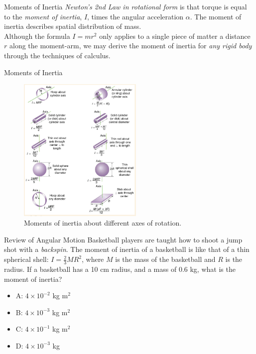 \documentclass{beamer}
\begin{document}
\begin{frame}{Moments of Inertia}
\textit{Newton's 2nd Law in rotational form} is that torque is equal to the \textit{moment of inertia}, $I$, times the angular acceleration $\alpha$.  \alert{The moment of inertia describes spatial distribution of mass}.  \\ \vspace{0.5cm} Although the formula $I = mr^2$ only applies to a single piece of matter a distance $r$ along the moment-arm, we may derive the moment of inertia for \textit{any rigid body} through the techniques of calculus.
\end{frame}

\begin{frame}{Moments of Inertia}
\begin{figure}
\centering
\includegraphics[width=0.53\textwidth]{figures/moment.png}
\caption{\label{fig:moment} Moments of inertia about different axes of rotation.}
\end{figure}
\end{frame}

\begin{frame}{Review of Angular Motion}
Basketball players are taught how to shoot a jump shot with a \textit{backspin}.  The moment of inertia of a basketball is like that of a thin spherical shell: $I = \frac{2}{3}MR^2$, where $M$ is the mass of the basketball and $R$ is the radius.  If a basketball has a 10 cm radius, and a mass of 0.6 kg, what is the moment of inertia?
\begin{itemize}
\item A: $4\times 10^{-2}$ kg m$^2$
\item B: $4\times 10^{-3}$ kg m$^2$
\item C: $4\times 10^{-1}$ kg m$^2$
\item D: $4\times 10^{-3}$ kg
\end{itemize}
\end{frame}
\end{document}
